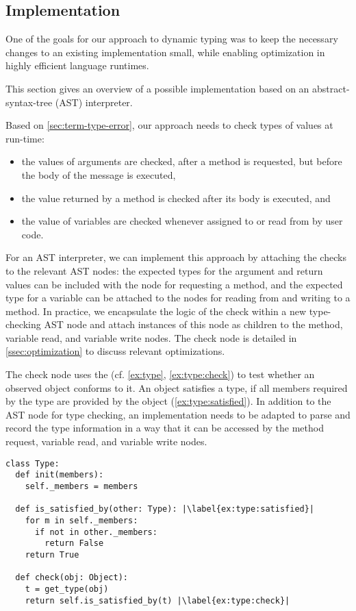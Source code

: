 \subsection{Implementation} 
\label{ssec:implementation} 

One of the goals for our approach to dynamic typing was to keep
the necessary changes to an existing implementation small,
while enabling optimization in highly efficient language runtimes.

This section gives an overview of a possible implementation
based on an abstract-syntax-tree (AST) interpreter.

Based on \cref{sec:term-type-error},
our approach needs to check types of values at run-time:

\begin{itemize}
\item the values of arguments are checked, after a method is requested, 
      but before the body of the message is executed,
\item the value returned by a method is checked after its body is executed, and
\item the value of variables are checked
      whenever assigned to or read from by user code.
\end{itemize}

For an AST interpreter,
we can implement this approach by attaching the checks to the relevant AST nodes:
the expected types for the argument and return values can be included
with the node for requesting a method, and the expected type for a variable
can be attached to the nodes for reading from and writing to a method.
In practice,
we encapsulate the logic of the check within a new type-checking AST node
and attach instances of this node as children to the method,
variable read, and variable write nodes. 
The check node is detailed in \cref{ssec:optimization} to discuss relevant
optimizations.

The check node uses the  (cf. \cref{ex:type}, \cref{ex:type:check}) to test whether an observed
object conforms to it.
An object satisfies a type, if all members required by the type are provided
by the object (\cref{ex:type:satisfied}).
In addition to the AST node for type checking,
an implementation needs to be adapted to parse and record
the type information in a way that it can be accessed by the
method request, variable read, and variable write nodes.


\begin{lstlisting}[label={ex:type},escapechar=|,caption={Sketch of a \code{Type} in our system and its \code{check()} semantics.},float,floatplacement=htb]
class Type:
  def init(members):
    self._members = members

  def is_satisfied_by(other: Type): |\label{ex:type:satisfied}|
    for m in self._members:
      if not in other._members:
        return False
    return True

  def check(obj: Object):
    t = get_type(obj)
    return self.is_satisfied_by(t) |\label{ex:type:check}|
\end{lstlisting}


